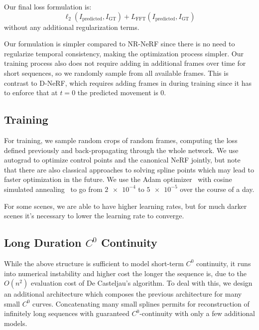 Our final loss formulation is:
\[ \ell_2(I_\text{predicted}, I_\text{GT}) + L_\text{FFT}(I_\text{predicted}, I_\text{GT}) \]
without any additional regularization terms.

Our formulation is simpler compared to NR-NeRF since there is no need to regularize
temporal consistency, making the optimization process simpler. Our training process also does not require adding in additional frames over time for short sequences, so we randomly sample from all available frames. This is contrast to D-NeRF, which requires adding frames in during training since it has to enforce that at $t=0$ the predicted movement is 0.

\subsection*{Training}

For training, we sample random crops of random frames, computing the loss defined previously and back-propagating through the whole network. We use autograd to optimize control points and the canonical NeRF jointly, but note that there are also classical approaches to solving spline points which may lead to faster optimization in the future. We use the Adam optimizer~\cite{Kingma2015AdamAM} with cosine simulated annealing~\cite{loshchilov2017sgdr} to go from $\num{2e-4}$ to $\num{5e-5}$ over the course of a day.

For some scenes, we are able to have higher learning rates, but for much darker scenes it's necessary to lower the learning rate to converge.

\subsection*{Long Duration $C^0$ Continuity}

While the above structure is sufficient to model short-term $C^0$ continuity, it runs into
numerical instability and higher cost the longer the sequence is, due to the $O(n^2)$
evaluation cost of De Casteljau's algorithm. To deal with this, we design an additional architecture which
composes the previous architecture for many small $C^0$ curves. Concatenating many small splines permits for reconstruction of infinitely long sequences with guaranteed $C^0$-continuity with only a few additional models.

